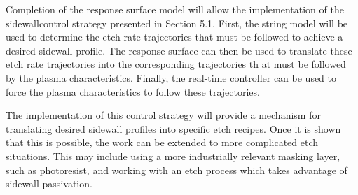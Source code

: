 Completion of the response surface model will allow the implementation of the sidewallcontrol strategy presented in Section 5.1. First, the string model will be used to determine
the etch rate trajectories that must be followed to achieve a desired sidewall profile. The
response surface can then be used to translate these etch rate trajectories into the corresponding trajectories th at must be followed by the plasma characteristics. Finally, the
real-time controller can be used to force the plasma characteristics to follow these trajectories.

The implementation of this control strategy will provide a mechanism for translating
desired sidewall profiles into specific etch recipes. Once it is shown that this is possible, the work can be extended to more complicated etch situations. This may include using a more
industrially relevant masking layer, such as photoresist, and working with an etch process
which takes advantage of sidewall passivation.